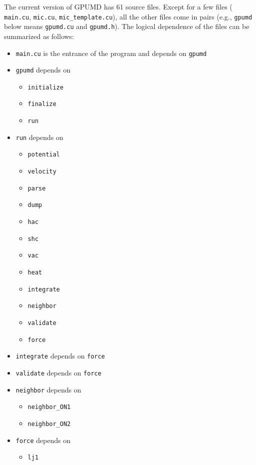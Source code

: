 \documentclass[12pt,a4paper]{report}
\begin{document}
The current version of GPUMD has 61 source files. Except for a few files ( \verb"main.cu", \verb"mic.cu", \verb"mic_template.cu"), all the other files come in pairs (e.g., \verb"gpumd" below means \verb"gpumd.cu" and \verb"gpumd.h"). The logical dependence of the files can be summarized as follows:

\begin{itemize}
\item \verb"main.cu" is the entrance of the program and depends on \verb"gpumd"
\item \verb"gpumd" depends on
  \begin{itemize}
    \item \verb"initialize"
    \item \verb"finalize"
    \item \verb"run"
  \end{itemize}
\item \verb"run" depends on
      \begin{itemize}
      \item \verb"potential"
      \item \verb"velocity"
      \item \verb"parse"
      \item \verb"dump"
      \item \verb"hac"
      \item \verb"shc"
      \item \verb"vac"
      \item \verb"heat"
      \item \verb"integrate"
      \item \verb"neighbor"
      \item \verb"validate"
      \item \verb"force"
      \end{itemize}
  \item \verb"integrate" depends on \verb"force"
  \item \verb"validate" depends on \verb"force"
  \item \verb"neighbor" depends on
        \begin{itemize}
        \item \verb"neighbor_ON1"
        \item \verb"neighbor_ON2"
        \end{itemize}
  \item \verb"force" depends on
        \begin{itemize}
        \item \verb"lj1"

\end{itemize}
\end{itemize}
\end{document}
